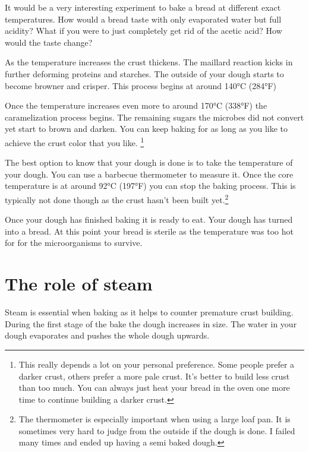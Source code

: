 It would be a very interesting experiment to bake a bread at different exact
temperatures. How would a bread taste with only evaporated water but
full acidity? What if you were to just completely get rid of the acetic
acid? How would the taste change?

As the temperature increases
the crust thickens. The maillard reaction kicks in further deforming
proteins and starches. The outside of your dough starts to become
browner and crisper. This process begins at around 140°C (284°F)

Once the temperature increases even more to around 170°C (338°F)
the caramelization process begins. The remaining sugars the microbes
did not convert yet start to brown and darken. You can keep baking
for as long as you like to achieve the crust color that you like.
\footnote{This really depends a lot on your personal preference.
Some people prefer a darker crust, others prefer a more pale crust.
It's better to build less crust than too much. You can always just
heat your bread in the oven one more time to continue building a
darker crust.}

The best option to know that your dough is done is to take
the temperature of your dough. You can use a barbecue thermometer
to measure it. Once the core temperature is at around 92°C (197°F)
you can stop the baking process. This is typically not done though
as the crust hasn't been built yet.\footnote{The thermometer is
especially important when using a large loaf pan. It is sometimes
very hard to judge from the outside if the dough is done. I failed
many times and ended up having a semi baked dough.}

Once your dough has finished baking it is ready to eat. Your
dough has turned into a bread. At this
point your bread is sterile as the temperature was too hot for
for the microorganisms to survive.

\section{The role of steam}

Steam is essential when baking as it helps to counter premature
crust building. During the first stage of the bake the dough
increases in size. The water in your dough evaporates and pushes
the whole dough upwards. 

